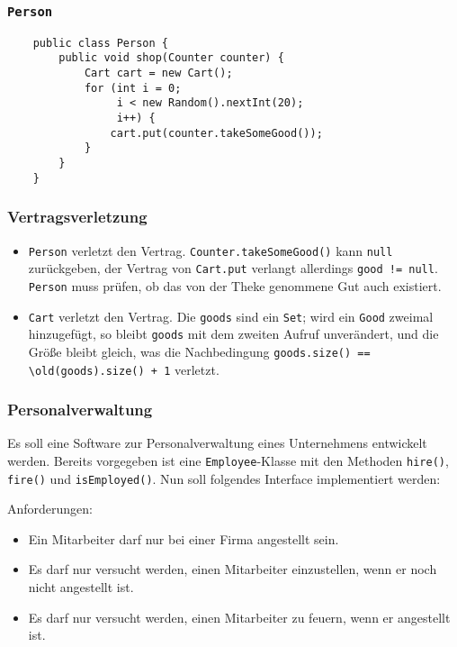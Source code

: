 \documentclass{beamer}
\begin{document}
\begin{frame}[fragile]
  \frametitle{\lstinline{Person}}
  \begin{lstlisting}
    public class Person {
        public void shop(Counter counter) {
            Cart cart = new Cart();
            for (int i = 0;
                 i < new Random().nextInt(20);
                 i++) {
                cart.put(counter.takeSomeGood());
            }
        }
    }
  \end{lstlisting}
\end{frame}

\begin{frame}[fragile]
  \frametitle{Vertragsverletzung}
  \begin{itemize}
  \item
    \pause
    \lstinline{Person} verletzt den Vertrag.
    \lstinline{Counter.takeSomeGood()} kann \lstinline{null} zurückgeben,
    der Vertrag von \lstinline{Cart.put} verlangt allerdings \lstinline{good != null}.
    \lstinline{Person} muss prüfen, ob das von der Theke genommene Gut auch existiert.
    \pause
  \item
    \lstinline{Cart} verletzt den Vertrag.
    Die \lstinline{goods} sind ein \lstinline{Set};
    wird ein \lstinline{Good} zweimal hinzugefügt,
    so bleibt \lstinline{goods} mit dem zweiten Aufruf unverändert,
    und die Größe bleibt gleich,
    was die Nachbedingung \lstinline{goods.size() == \old(goods).size() + 1} verletzt.
  \end{itemize}
\end{frame}

\begin{frame}
  \frametitle{Personalverwaltung}
  Es soll eine Software zur Personalverwaltung eines Unternehmens entwickelt werden.
  Bereits vorgegeben ist eine \lstinline{Employee}-Klasse
  mit den Methoden \lstinline{hire()}, \lstinline{fire()} und \lstinline{isEmployed()}.
  Nun soll folgendes Interface implementiert werden:
  
  Anforderungen:
  \begin{itemize}
  \item
    Ein Mitarbeiter darf nur bei einer Firma angestellt sein.
  \item
    Es darf nur versucht werden, einen Mitarbeiter einzustellen, wenn er noch nicht angestellt ist.
  \item
    Es darf nur versucht werden, einen Mitarbeiter zu feuern, wenn er angestellt ist.
  \end{itemize}
\end{frame}
\end{document}
